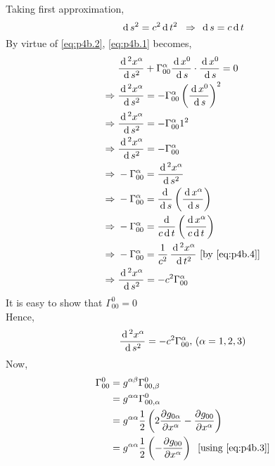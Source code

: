 \documentclass[../main-sheet.tex]{subfiles}
\begin{document}
\begin{soln}
            Taking first approximation,
            \begin{equation}
                \,\mathrm{d}\, s^2=c^2\,\mathrm{d}\, t^2\;\;\Rightarrow\;\,\mathrm{d}\, s=c\,\mathrm{d}\, t \label{eq:p4b.4}
            \end{equation}
            By virtue of \eqref{eq:p4b.2}, \eqref{eq:p4b.1} becomes,
            \begin{align*}
                & \frac{\,\mathrm{d}\,^2 x^\alpha}{\,\mathrm{d}\, s^2}+\Gamma_{00}^\alpha \frac{\,\mathrm{d}\, x^0}{\,\mathrm{d}\, s}\cdot \frac{\,\mathrm{d}\, x^0}{\,\mathrm{d}\, s}=0\\
                \Rightarrow\;& \frac{\,\mathrm{d}\,^2 x^\alpha}{\,\mathrm{d}\, s^2}=-\Gamma_{00}^\alpha \left(\frac{\,\mathrm{d}\, x^0}{\,\mathrm{d}\, s}\right)^2\\
                \Rightarrow\;& \frac{\,\mathrm{d}\,^2 x^\alpha}{\,\mathrm{d}\, s^2}=-\Gamma_{00}^\alpha 1^2\\
                \Rightarrow\;& \frac{\,\mathrm{d}\,^2 x^\alpha}{\,\mathrm{d}\, s^2}=-\Gamma_{00}^\alpha\\
                \Rightarrow\;& -\Gamma_{00}^\alpha=\frac{\,\mathrm{d}\,^2 x^\alpha}{\,\mathrm{d}\, s^2}\\
                \Rightarrow\;& -\Gamma_{00}^\alpha=\frac{\,\mathrm{d}\,}{\,\mathrm{d}\, s}\left(\frac{\,\mathrm{d}\, x^\alpha}{\,\mathrm{d}\, s}\right)\\
                \Rightarrow\;& -\Gamma_{00}^\alpha=\frac{\,\mathrm{d}\,}{c\,\mathrm{d}\, t}\left(\frac{\,\mathrm{d}\, x^\alpha}{c \,\mathrm{d}\, t}\right)\\
                \Rightarrow\;& -\Gamma_{00}^\alpha=\frac{1}{c^2}\,\frac{\,\mathrm{d}\,^2 x^\alpha}{\,\mathrm{d}\, t^2}\,\,[\text{by \eqref{eq:p4b.4}}]\\
                \Rightarrow\;&\frac{\,\mathrm{d}\,^2 x^\alpha}{\,\mathrm{d}\, s^2}= -c^2\Gamma_{00}^\alpha
            \end{align*}
            It is easy to show that \(\Gamma_{00}^0=0\)\\
            Hence,
            \begin{equation}
                \frac{\,\mathrm{d}\,^2 x^\alpha}{\,\mathrm{d}\, s^2}= -c^2\Gamma_{00}^\alpha,\,(\alpha=1,2,3)
                \label{eq:p4b.5}
            \end{equation}
            Now,
            \begin{align*}
                \Gamma_{00}^0&=g^{\alpha\beta}\Gamma_{00,\beta}^0\\
                &=g^{\alpha\alpha}\Gamma_{00,\alpha}^0\\
                &=g^{\alpha\alpha}\frac{1}{2}\left( 2\frac{\partial g_{0\alpha}}{\partial x^\alpha}-\frac{\partial g_{00}}{\partial x^\alpha} \right)\\
                &=g^{\alpha\alpha}\frac{1}{2}\left( -\frac{\partial g_{00}}{\partial x^\alpha}\right)\;\;\text{[using \eqref{eq:p4b.3}]}\\

\end{align*}
\end{soln}
\end{document}
